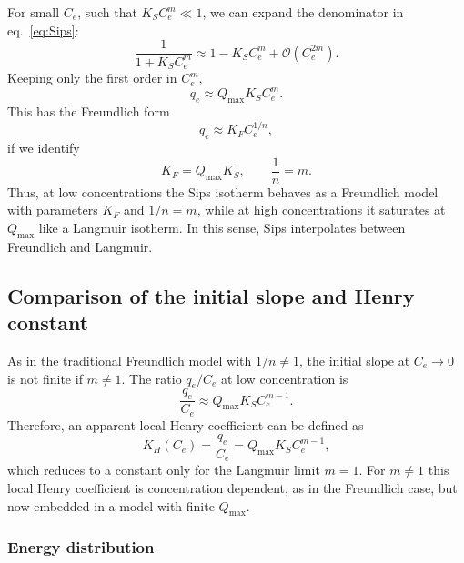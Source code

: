 	For small \(C_e\), such that \(K_S C_e^{m} \ll 1\), we can expand
	the denominator in eq.~\eqref{eq:Sips}:
	\begin{equation}
		\frac{1}{1 + K_S C_e^{m}}
		\approx 1 - K_S C_e^{m} + \mathcal{O}(C_e^{2m}).
	\end{equation}
	Keeping only the first order in \(C_e^{m}\),
	\begin{equation}
		q_e \approx Q_{\max} K_S C_e^{m}.
	\end{equation}
	This has the Freundlich form
	\begin{equation}
		q_e \approx K_F C_e^{1/n},
	\end{equation}
	if we identify
	\begin{equation}
		K_F = Q_{\max} K_S, \qquad \frac{1}{n} = m.
	\end{equation}
	Thus, at low concentrations the Sips isotherm behaves as a
	Freundlich model with parameters \(K_F\) and \(1/n = m\), while at
	high concentrations it saturates at \(Q_{\max}\) like a Langmuir
	isotherm. In this sense, Sips interpolates between Freundlich and
	Langmuir.
	
	\subsection{Comparison of the initial slope and Henry constant}
	
	As in the traditional Freundlich model with \(1/n \neq 1\), the
	initial slope at \(C_e \to 0\) is not finite if \(m \neq 1\). The
	ratio \(q_e / C_e\) at low concentration is
	\begin{equation}
		\frac{q_e}{C_e}
		\approx Q_{\max} K_S C_e^{m-1}.
	\end{equation}
	Therefore, an apparent local Henry coefficient can be defined as
	\begin{equation}
		K_H(C_e)
		= \frac{q_e}{C_e}
		= Q_{\max} K_S C_e^{m - 1},
	\end{equation}
	which reduces to a constant only for the Langmuir limit \(m = 1\).
	For \(m \neq 1\) this local Henry coefficient is concentration
	dependent, as in the Freundlich case, but now embedded in a model
	with finite \(Q_{\max}\).
	
	\subsubsection{Energy distribution}
	
